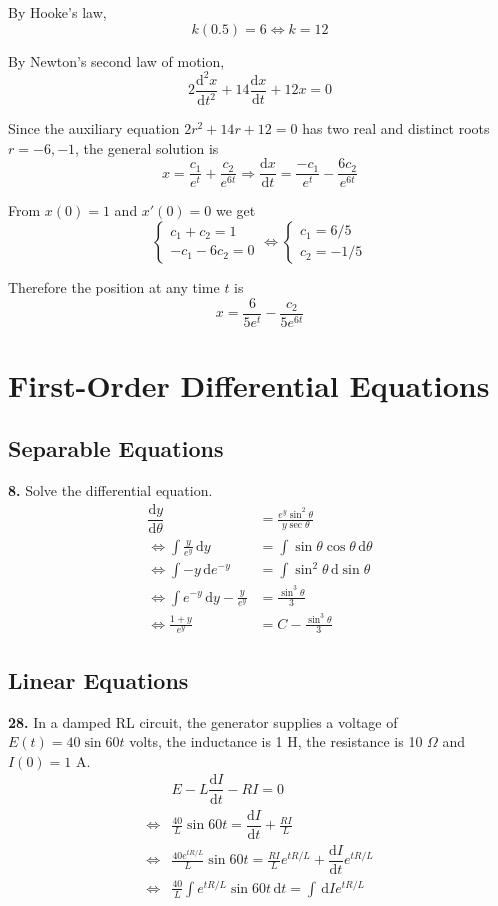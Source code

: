 \documentclass[a4paper,12pt]{article}
\newcommand{\ud}{\,\mathrm{d}}
\newcommand{\leibniz}[3][]{\dfrac{\mathrm{d} #1 #2}{\mathrm{d} #3 #1}}
\newcommand{\exercise}[1]{\noindent\textbf{#1.}}
\begin{document}
By Hooke's law, 
\[k(0.5) = 6 \iff k = 12\]

By Newton's second law of motion,
\[2\leibniz{^2 x}{t^2} + 14\leibniz{x}{t} + 12x = 0\]

Since the auxiliary equation $2r^2 + 14r + 12 = 0$ has two real
and distinct roots $r = -6, -1$, the general solution is
\[x = \frac{c_1}{e^t} + \frac{c_2}{e^{6t}}
\Longrightarrow \leibniz{x}{t} = \frac{-c_1}{e^t} - \frac{6c_2}{e^{6t}}\]

From $x(0) = 1$ and $x'(0) = 0$ we get
\[\begin{cases}
  c_1 + c_2 = 1\\
  -c_1 - 6c_2 = 0
\end{cases}
\iff\begin{cases}
  c_1 = 6/5\\
  c_2 = -1/5
\end{cases}\]

Therefore the position at any time $t$ is
\[x = \frac{6}{5e^t} - \frac{c_2}{5e^{6t}}\]

\setcounter{section}{8}
\section{First-Order Differential Equations}
\setcounter{subsection}{2}
\subsection{Separable Equations}
\exercise{8} Solve the differential equation.
\begin{align*}
  \leibniz{y}{\theta} &= \frac{e^y\sin^2\theta}{y\sec\theta}\\
  \iff \int\frac{y}{e^y}\ud y &= \int\sin\theta\cos\theta\ud\theta\\
  \iff \int-y\ud e^{-y} &= \int\sin^2\theta\ud\sin\theta\\
  \iff \int e^{-y}\ud y - \frac{y}{e^y} &= \frac{\sin^3\theta}{3}\\
  \iff \frac{1 + y}{e^y} &= C - \frac{\sin^3\theta}{3}
\end{align*}
\setcounter{subsection}{4}
\subsection{Linear Equations}
\exercise{28} In a damped RL circuit, the generator supplies a voltage of
$E(t) = 40\sin 60t$ volts, the inductance is 1 H, the resistance is 10 $\Omega$
and $I(0) = 1$ A.
\begin{align*}
  &E - L\leibniz{I}{t} - RI = 0\\
  \iff &\frac{40}{L}\sin 60t = \leibniz{I}{t} + \frac{RI}{L}\\
  \iff &\frac{40e^{tR/L}}{L}\sin 60t
    = \frac{RI}{L}e^{tR/L} + \leibniz{I}{t}e^{tR/L}\\
  \iff &\frac{40}{L}\int e^{tR/L}\sin 60t\ud t = \int\ud Ie^{tR/L}\tag{$*$}
\end{align*}
\end{document}

